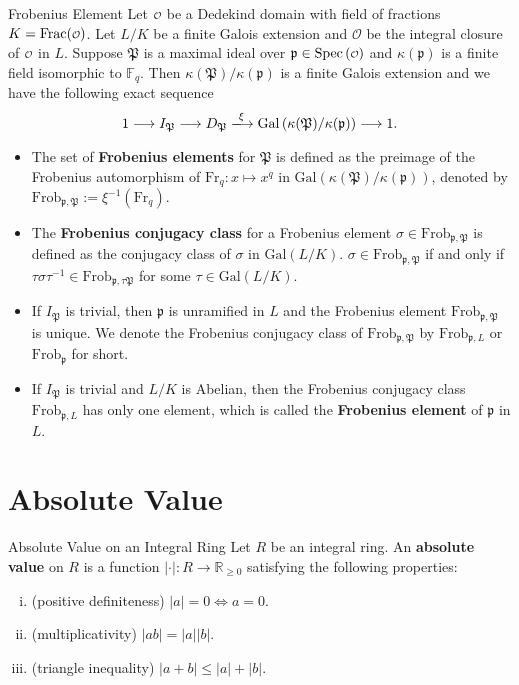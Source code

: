 \begin{definition}{Frobenius Element}{}
    Let $\mathcalo$ be a Dedekind domain with field of fractions $K=\mathrm{Frac}(\mathcalo)$. Let $L/K$ be a finite Galois extension and $\mathcal{O}$ be the integral closure of $\mathcalo$ in $L$. Suppose $\mathfrak{P}$ is a maximal ideal over $\mathfrak{p}\in \spec\left(\mathcalo\right)$ and $\kappa(\mathfrak{p})$ is a finite field isomorphic to $\mathbb{F}_{q}$. Then $\kappa(\mathfrak{P})/\kappa(\mathfrak{p})$ is a finite Galois extension and we have the following exact sequence
    \[
    1\longrightarrow I_{\mathfrak{P}}\longrightarrow D_{\mathfrak{P}}\xlongrightarrow{\xi} \mathrm{Gal}\left(\kappa(\mathfrak{P})/\kappa(\mathfrak{p})\right)\longrightarrow 1.
    \]
    \begin{itemize}
        \item The set of \textbf{Frobenius elements} for $\mathfrak{P}$ is defined as the preimage of the Frobenius automorphism of $\mathrm{Fr}_q:x\mapsto x^q$ in $\mathrm{Gal}\left(\kappa(\mathfrak{P})/\kappa(\mathfrak{p})\right)$, denoted by $\mathrm{Frob}_{\mathfrak{p},\mathfrak{P}}:=\xi^{-1}\left(\mathrm{Fr}_q\right)$.
        \item The \textbf{Frobenius conjugacy class} for a Frobenius element $\sigma\in \mathrm{Frob}_{\mathfrak{p},\mathfrak{P}}$ is defined as the conjugacy class of $\sigma$ in $\mathrm{Gal}(L/K)$. $\sigma \in \mathrm{Frob}_{\mathfrak{p},\mathfrak{P}}$ if and only if $\tau \sigma \tau^{-1}\in  \mathrm{Frob}_{\mathfrak{p},\tau \mathfrak{P}}$ for some $\tau\in \mathrm{Gal}(L/K)$.
        \item If $I_{\mathfrak{P}}$ is trivial, then $\mathfrak{p}$ is unramified in $L$ and the Frobenius element $\mathrm{Frob}_{\mathfrak{p},\mathfrak{P}}$ is unique. We denote the Frobenius conjugacy class of $\mathrm{Frob}_{\mathfrak{p},\mathfrak{P}}$ by $\mathrm{Frob}_{\mathfrak{p}, L}$ or $\mathrm{Frob}_{\mathfrak{p}}$ for short.
        \item If $I_{\mathfrak{P}}$ is trivial and $L/K$ is Abelian, then the Frobenius conjugacy class $\mathrm{Frob}_{\mathfrak{p}, L}$ has only one element, which is called the \textbf{Frobenius element} of $\mathfrak{p}$ in $L$.
    \end{itemize}
    
\end{definition}


\section{Absolute Value}
\begin{definition}{Absolute Value on an Integral Ring}{}
    Let $R$ be an integral ring. An \textbf{absolute value} on $R$ is a function $|\cdot|:R\to \mathbb{R}_{\ge0}$ satisfying the following properties:
    \begin{enumerate}[(i)]
        \item (positive definiteness) $|a|=0\iff a=0$.
        \item (multiplicativity) $|ab|=|a||b|$.
        \item (triangle inequality) $|a+b|\le |a|+|b|$.
    \end{enumerate}
\end{definition}


